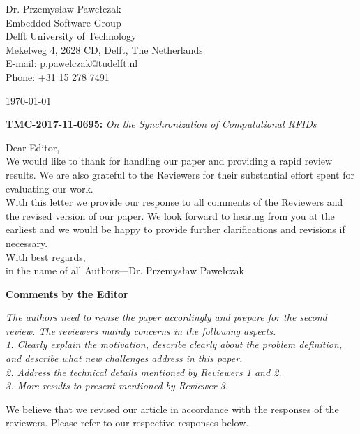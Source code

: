 \documentclass[10pt]{article}
\newcommand{\referee}[1]{
	{\item \color{OliveGreen} \emph{{#1}}}
	\label{R\therefereeCounter:\arabic{enumi}}
}
\newcommand{\response}[1]{{\color{blue} #1}}
\newenvironment{editor}{%
\textbf{\large Comments by the Editor}
\begin{enumerate}%
\renewcommand{\labelenumi}{\textbf{[E:\,\arabic{enumi}]}} %
}{\pagebreak\end{enumerate}}
\newcounter{refereeCounter}
\begin{document}
\pagestyle{myheadings}
\thispagestyle{empty}


\headsep 0.5cm

\bigskip\bigskip


\bigskip\bigskip

\begin{flushright}
Dr. Przemys{\l}aw Pawe{\l}czak \\
Embedded Software Group \\ 
Delft University of Technology \\ 
Mekelweg 4, 2628 CD, Delft, The Netherlands \\
E-mail: p.pawelczak@tudelft.nl\\
Phone: +31 15 278 7491\\
\end{flushright}

\vspace*{2cm}

\today
\medskip


\textbf{TMC-2017-11-0695:} {\sl On the Synchronization of Computational RFIDs}

\bigskip

Dear Editor,\\

We would like to thank for handling our paper and providing a rapid review results. We are also grateful to the Reviewers for their substantial effort spent for evaluating our work. \\

With this letter we provide our response to all comments of the Reviewers and the revised version of our paper. We look forward to hearing from you at the earliest and we would be happy to provide further clarifications and revisions if necessary. \\

With best regards, \\

in the name of all Authors---Dr. Przemys{\l}aw Pawe{\l}czak

\pagebreak

\begin{editor}
\referee{The authors need to revise the paper accordingly and prepare for the second review. The reviewers mainly concerns in the following aspects. \\
1. Clearly explain the motivation, describe clearly about the problem definition, and describe what new challenges address
in this paper. \\
2. Address the technical details mentioned by Reviewers 1 and 2. \\
3. More results to present mentioned by Reviewer 3.
}

\response{
	We believe that we revised our article in accordance with the responses of the reviewers. Please refer to our respective responses below. 
}

\end{editor}
\end{document}
